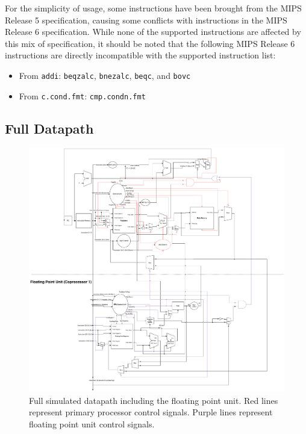 \documentclass[
    paper=letter,
    parskip=half,
    fontsize=12pt,
    titlepage=firstiscover,
    toc=bibliography,
    numbers=endperiod
]{scrartcl}
\providecommand{\tightlist}{%
  \setlength{\itemsep}{0pt}\setlength{\parskip}{0pt}}
\begin{document}
For the simplicity of usage, some instructions have been brought from
the MIPS Release 5 specification, causing some conflicts with
instructions in the MIPS Release 6 specification. While none of the
supported instructions are affected by this mix of specification, it
should be noted that the following MIPS Release 6 instructions are
directly incompatible with the supported instruction list:

\begin{itemize}
    \tightlist
    \item From \texttt{addi}: \texttt{beqzalc}, \texttt{bnezalc}, \texttt{beqc},
          and \texttt{bovc}
    \item From \texttt{c.cond.fmt}: \texttt{cmp.condn.fmt}
\end{itemize}

\subsection{Full Datapath}

\begin{figure}[H]
    \includegraphics[width=\textwidth]{swim-datapath}
    \caption{Full simulated datapath including the floating point unit. Red lines represent primary processor control signals. Purple lines represent floating point unit control signals.}
\end{figure}
\end{document}
